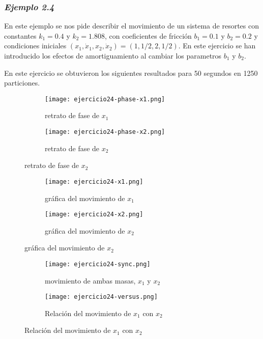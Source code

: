 \documentclass{article}
\begin{document}
\subsubsection*{\textit{Ejemplo 2.4}}

En este ejemplo se nos pide describir el movimiento de un sistema de resortes con constantes $k_1=0.4$ y $k_2=1.808$, con coeficientes de fricción $b_1=0.1$ y $b_2=0.2$ y condiciones iniciales $(x_1,\dot{x}_1,x_2,\dot{x}_2)=(1,1/2,2,1/2)$. En este ejercicio se han introducido los efectos de amortiguamiento al cambiar los parametros $b_1$ y $b_2$.

En este ejercicio se obtuvieron los siguientes resultados para 50 segundos en 1250 particiones.

\begin{figure}[ht!]
	\begin{subfigure}[b]{0.5\linewidth}
    \raggedleft
	\texttt{[image: ejercicio24-phase-x1.png]}
    \caption{retrato de fase de $x_1$}
	\end{subfigure}
	\begin{subfigure}[b]{0.5\linewidth}
    \raggedright
	\texttt{[image: ejercicio24-phase-x2.png]}
	\caption{retrato de fase de $x_2$}
    \end{subfigure}
\end{figure}

\begin{figure}[ht!]
	\begin{subfigure}[b]{0.5\linewidth}
    \raggedleft
	\texttt{[image: ejercicio24-x1.png]}
    \caption{gráfica del movimiento de $x_1$}
	\end{subfigure}
	\begin{subfigure}[b]{0.5\linewidth}
    \raggedright
	\texttt{[image: ejercicio24-x2.png]}
	\caption{gráfica del movimiento de $x_2$}
    \end{subfigure}
\end{figure}

\begin{figure}[ht!]
	\begin{subfigure}[b]{0.5\linewidth}
    \raggedleft
	\texttt{[image: ejercicio24-sync.png]}
    \caption{movimiento de ambas masas, $x_1$ y $x_2$}
	\end{subfigure}
	\begin{subfigure}[b]{0.5\linewidth}
    \raggedright
	\texttt{[image: ejercicio24-versus.png]}
	\caption{Relación del movimiento de $x_1$ con $x_2$}
    \end{subfigure}
\end{figure}
\end{document}
